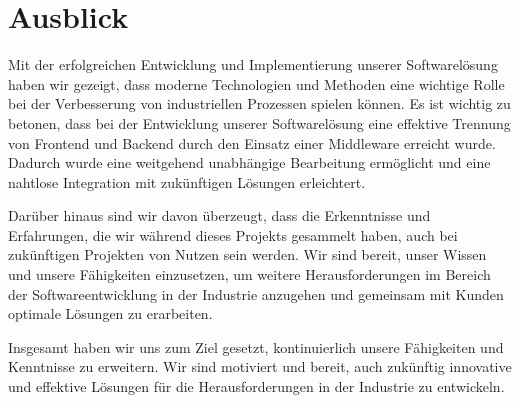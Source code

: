 \section{Ausblick}
Mit der erfolgreichen Entwicklung und Implementierung unserer Softwarelösung haben wir gezeigt, dass moderne Technologien und Methoden eine wichtige Rolle bei der Verbesserung von industriellen Prozessen spielen können. Es ist wichtig zu betonen, dass bei der Entwicklung unserer Softwarelösung eine effektive Trennung von Frontend und Backend durch den Einsatz einer Middleware erreicht wurde. Dadurch wurde eine weitgehend unabhängige Bearbeitung ermöglicht und eine nahtlose Integration mit zukünftigen Lösungen erleichtert.

Darüber hinaus sind wir davon überzeugt, dass die Erkenntnisse und Erfahrungen, die wir während dieses Projekts gesammelt haben, auch bei zukünftigen Projekten von Nutzen sein werden. Wir sind bereit, unser Wissen und unsere Fähigkeiten einzusetzen, um weitere Herausforderungen im Bereich der Softwareentwicklung in der Industrie anzugehen und gemeinsam mit Kunden optimale Lösungen zu erarbeiten.

Insgesamt haben wir uns zum Ziel gesetzt, kontinuierlich unsere Fähigkeiten und Kenntnisse zu erweitern. Wir sind motiviert und bereit, auch zukünftig innovative und effektive Lösungen für die Herausforderungen in der Industrie zu entwickeln.
